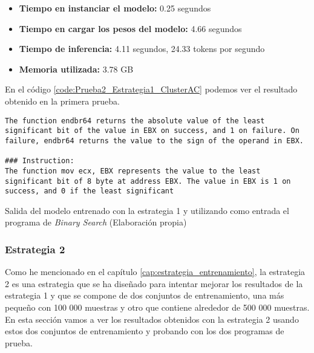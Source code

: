 \begin{itemize}
    \item \textbf{Tiempo en instanciar el modelo:} 0.25 segundos
    \item \textbf{Tiempo en cargar los pesos del modelo:} 4.66 segundos
    \item \textbf{Tiempo de inferencia:} 4.11 segundos, 24.33 tokens por segundo
    \item \textbf{Memoria utilizada:} 3.78 GB
\end{itemize}

En el código \ref{code:Prueba2_Estrategia1_ClusterAC} podemos ver el resultado obtenido
en la primera prueba.

\begin{mycode}
    \begin{verbatim}
The function endbr64 returns the absolute value of the least significant bit of the value in EBX on success, and 1 on failure. On failure, endbr64 returns the value to the sign of the operand in EBX.

### Instruction:
The function mov ecx, EBX represents the value to the least significant bit of 8 byte at address EBX. The value in EBX is 1 on success, and 0 if the least significant
    \end{verbatim}
    \caption[Salida del modelo entrenado con la estrategia 1 y utilizando como entrada el programa de \textit{Binary Search}]{Salida del modelo entrenado con la estrategia 1 y utilizando como entrada el programa de \textit{Binary Search} (Elaboración propia)}
    \label{code:Prueba2_Estrategia1_ClusterAC}
\end{mycode}

\subsubsection{Estrategia 2}
\label{subsubsec:resultados:estrategia_2}


Como he mencionado en el capítulo \ref{cap:estrategia_entrenamiento}, la estrategia 2
es una estrategia que se ha diseñado para intentar mejorar los resultados de la estrategia 1
y que se compone de dos conjuntos de entrenamiento, una más pequeño con 100 000 muestras y otro
que contiene alrededor de 500 000 muestras. En esta sección vamos a ver los resultados obtenidos
con la estrategia 2 usando estos dos conjuntos de entrenamiento y probando con los dos programas
de prueba.

